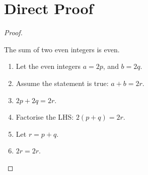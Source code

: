 \section{Direct Proof}
\begin{proof}
    \begin{theorem}
        The sum of two even integers is even.
    \end{theorem}
    \begin{enumerate}
        \item Let the even integers \(a = 2p\), and \(b = 2q\).
        \item Assume the statement is true: \(a + b = 2r\).
        \item \(2p + 2q = 2r\).
        \item Factorise the LHS: \(2(p + q) = 2r\).
        \item Let \(r = p + q\).
        \item \(2r = 2r\).
    \end{enumerate}
\end{proof}
